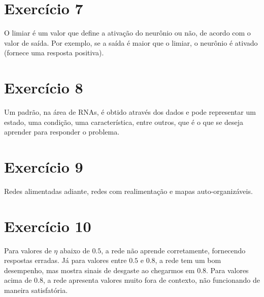 \documentclass[a4]{article}
\begin{document}
\section*{Exercício 7}

O limiar é um valor que define a ativação do neurônio ou não, de acordo com o valor de saída. Por exemplo, se a saída é maior que o limiar, o neurônio é ativado (fornece uma resposta positiva).

\section*{Exercício 8}

Um padrão, na área de RNAs, é obtido através dos dados e pode representar um estado, uma condição, uma característica, entre outros, que é o que se deseja aprender para responder o problema.

\section*{Exercício 9}

Redes alimentadas adiante, redes com realimentação e mapas auto-organizáveis.

\section*{Exercício 10}

Para valores de $ \eta $ abaixo de $ 0.5 $, a rede não aprende corretamente, fornecendo respostas erradas. Já para valores entre $ 0.5 $ e $ 0.8 $, a rede tem um bom desempenho, mas mostra sinais de desgaste ao chegarmos em $ 0.8 $. Para valores acima de $ 0.8 $, a rede apresenta valores muito fora de contexto, não funcionando de maneira satisfatória.
\end{document}

